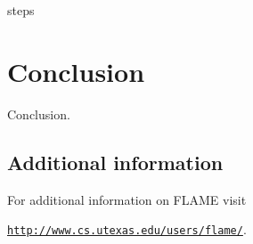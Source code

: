  {steps}


\section{Conclusion}
\label{sec:conclusion}

Conclusion.


\subsection*{Additional information}

For additional information on FLAME visit
\begin{center}
\href{http://www.cs.utexas.edu/users/flame/}
     {\tt http://www.cs.utexas.edu/users/flame/}.
\end{center}
